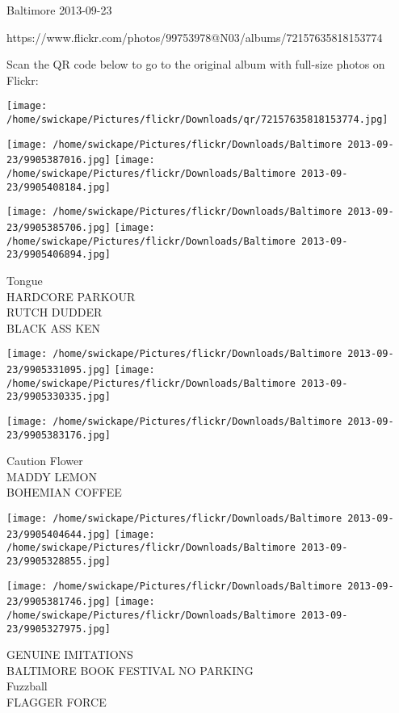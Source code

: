 \documentclass[10pt,letterpaper]{article}
\begin{document}
Baltimore 2013-09-23

https://www.flickr.com/photos/99753978@N03/albums/72157635818153774

Scan the QR code below to go to the original album with full-size photos on Flickr:

\texttt{[image: /home/swickape/Pictures/flickr/Downloads/qr/72157635818153774.jpg]}
\pagebreak

\texttt{[image: /home/swickape/Pictures/flickr/Downloads/Baltimore 2013-09-23/9905387016.jpg]}
\texttt{[image: /home/swickape/Pictures/flickr/Downloads/Baltimore 2013-09-23/9905408184.jpg]}

\texttt{[image: /home/swickape/Pictures/flickr/Downloads/Baltimore 2013-09-23/9905385706.jpg]}
\texttt{[image: /home/swickape/Pictures/flickr/Downloads/Baltimore 2013-09-23/9905406894.jpg]}

Tongue\\
HARDCORE PARKOUR\\
RUTCH DUDDER\\
BLACK ASS KEN\\
\pagebreak

\texttt{[image: /home/swickape/Pictures/flickr/Downloads/Baltimore 2013-09-23/9905331095.jpg]}
\texttt{[image: /home/swickape/Pictures/flickr/Downloads/Baltimore 2013-09-23/9905330335.jpg]}

\vspace{0.25in}
\texttt{[image: /home/swickape/Pictures/flickr/Downloads/Baltimore 2013-09-23/9905383176.jpg]}

Caution Flower\\
MADDY LEMON\\
BOHEMIAN COFFEE\\
\pagebreak

\texttt{[image: /home/swickape/Pictures/flickr/Downloads/Baltimore 2013-09-23/9905404644.jpg]}
\texttt{[image: /home/swickape/Pictures/flickr/Downloads/Baltimore 2013-09-23/9905328855.jpg]}

\texttt{[image: /home/swickape/Pictures/flickr/Downloads/Baltimore 2013-09-23/9905381746.jpg]}
\texttt{[image: /home/swickape/Pictures/flickr/Downloads/Baltimore 2013-09-23/9905327975.jpg]}

GENUINE IMITATIONS\\
BALTIMORE BOOK FESTIVAL NO PARKING\\
Fuzzball\\
FLAGGER FORCE\\
\pagebreak
\end{document}
